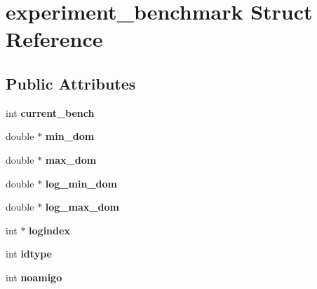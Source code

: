 \hypertarget{structexperiment__benchmark}{\section{experiment\-\_\-benchmark Struct Reference}
\label{structexperiment__benchmark}
}
\subsection*{Public Attributes}
\begin{DoxyCompactItemize}
\item 
\hypertarget{structexperiment__benchmark_a547380817705dad39ba833820ca68fb2}{int {\bfseries current\-\_\-bench}}\label{structexperiment__benchmark_a547380817705dad39ba833820ca68fb2}

\item 
\hypertarget{structexperiment__benchmark_a7c77b9ca32677166dc1df7bc8718b32e}{double $\ast$ {\bfseries min\-\_\-dom}}\label{structexperiment__benchmark_a7c77b9ca32677166dc1df7bc8718b32e}

\item 
\hypertarget{structexperiment__benchmark_a5a7165e6af60e0ccaee39ace34ada8a0}{double $\ast$ {\bfseries max\-\_\-dom}}\label{structexperiment__benchmark_a5a7165e6af60e0ccaee39ace34ada8a0}

\item 
\hypertarget{structexperiment__benchmark_a3274fa4060b566c2365cb2e6df4e929d}{double $\ast$ {\bfseries log\-\_\-min\-\_\-dom}}\label{structexperiment__benchmark_a3274fa4060b566c2365cb2e6df4e929d}

\item 
\hypertarget{structexperiment__benchmark_a2bb46e13359bd136ad816f5174617f17}{double $\ast$ {\bfseries log\-\_\-max\-\_\-dom}}\label{structexperiment__benchmark_a2bb46e13359bd136ad816f5174617f17}

\item 
\hypertarget{structexperiment__benchmark_a56f1f7adb21ece1bb5c23724ca1da88e}{int $\ast$ {\bfseries logindex}}\label{structexperiment__benchmark_a56f1f7adb21ece1bb5c23724ca1da88e}

\item 
\hypertarget{structexperiment__benchmark_a62f2308c9bce2fafd36775f72d9b6144}{int {\bfseries idtype}}\label{structexperiment__benchmark_a62f2308c9bce2fafd36775f72d9b6144}

\item 
\hypertarget{structexperiment__benchmark_aca1d5bdf12cfc521cb688ff7ce869ce5}{int {\bfseries noamigo}}\label{structexperiment__benchmark_aca1d5bdf12cfc521cb688ff7ce869ce5}


\end{DoxyCompactItemize}
